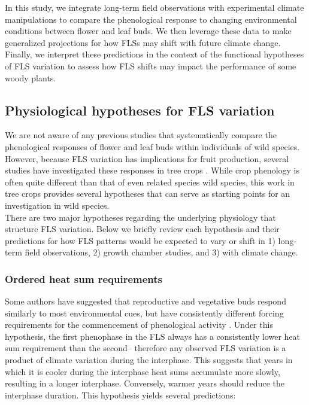 \documentclass[11pt]{article}
\begin{document}
\noindent In this study, we integrate long-term field observations with experimental climate manipulations to compare the phenological response to changing environmental conditions between flower and leaf buds. We then leverage these data to make generalized projections for how FLSs may shift with future climate change. Finally, we interpret these predictions in the context of the functional hypotheses of FLS variation to assess how FLS shifts may impact the performance of some woody plants.\\  

\subsection*{Physiological hypotheses for FLS variation}
\noindent We are not aware of any previous studies that systematically compare the phenological responses of flower and leaf buds within individuals of wild species. However, because FLS variation has implications for fruit production, several studies have investigated these responses in tree crops \citep[see][]{Guo_2014,Garigalio2016,Citadin2001}. While crop phenology is often quite different than that of even related species wild species, this work in tree crops provides several hypotheses that can serve as starting points for an investigation in wild species.\\

\noindent There are two major hypotheses regarding the underlying physiology that structure FLS variation. Below we briefly review each hypothesis and their predictions for how FLS patterns would be expected to vary or shift in 1) long-term field observations, 2) growth chamber studies, and 3) with climate change.

\subsubsection*{Ordered heat sum requirements}%
\noindent Some authors have suggested that reproductive and vegetative buds respond similarly to most environmental cues, but have consistently different forcing requirements for the commencement of phenological activity \citep{Guo_2014}. Under this hypothesis, the first phenophase in the FLS always has a consistently lower heat sum requirement than the second-- therefore any observed FLS variation is a product of climate variation during the interphase. This suggests that years in which it is cooler during the interphase heat sums accumulate more slowly, resulting in a longer interphase. Conversely, warmer years should reduce the interphase duration. This hypothesis yields several predictions:\\
\end{document}
